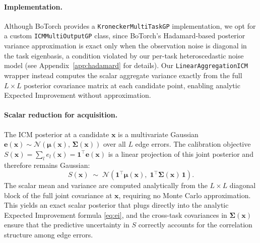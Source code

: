 \documentclass[11pt]{article}
\begin{document}
\paragraph{Implementation.}
Although BoTorch provides a \texttt{KroneckerMultiTaskGP} implementation, we opt for
a custom \texttt{ICMMultiOutputGP} class, since BoTorch's Hadamard-based posterior
variance approximation is exact only when the observation noise is diagonal in the
task eigenbasis, a condition violated by our per-task heteroscedastic noise model
(see Appendix~\ref{app:hadamard} for details). Our \texttt{LinearAggregationICM}
wrapper instead computes the scalar aggregate variance exactly from the full
$L \times L$ posterior covariance matrix at each candidate point, enabling analytic
Expected Improvement without approximation.



\paragraph{Scalar reduction for acquisition.}
The ICM posterior at a candidate $\mathbf{x}$ is a multivariate Gaussian
$\mathbf{e}(\mathbf{x}) \sim \mathcal{N}(\boldsymbol{\mu}(\mathbf{x}),\,
\boldsymbol{\Sigma}(\mathbf{x}))$ over all $L$ edge errors. The calibration
objective $S(\mathbf{x}) = \sum_l e_l(\mathbf{x}) = \mathbf{1}^\top \mathbf{e}(\mathbf{x})$
is a linear projection of this joint posterior and therefore remains Gaussian:
%
\begin{equation}
    S(\mathbf{x}) \;\sim\; \mathcal{N}\!\left(
        \mathbf{1}^\top \boldsymbol{\mu}(\mathbf{x}),\;
        \mathbf{1}^\top \boldsymbol{\Sigma}(\mathbf{x})\, \mathbf{1}
    \right).
\end{equation}
%
The scalar mean and variance are computed analytically from the $L \times L$
diagonal block of the full joint covariance at $\mathbf{x}$, requiring no Monte
Carlo approximation. This yields an exact scalar posterior that plugs directly into
the analytic Expected Improvement formula \eqref{eq:ei}, and the cross-task
covariances in $\boldsymbol{\Sigma}(\mathbf{x})$ ensure that the predictive
uncertainty in $S$ correctly accounts for the correlation structure among edge errors.
\end{document}
